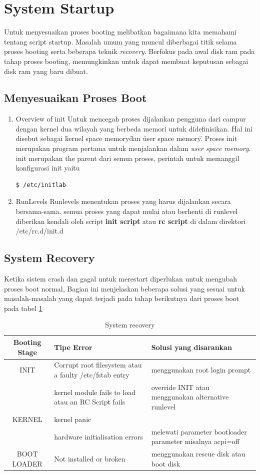 \section{System Startup}
Untuk menyesuaikan proses booting melibatkan bagaimana kita memahami tentang script startup. Masalah umum yang muncul diberbagai titik selama proses booting serta beberapa teknik \textit{recovery}. Berfokus pada awal disk ram pada tahap proses booting, memungkinkan untuk dapat membuat keputusan sebagai disk ram yang baru dibuat.
\subsection{Menyesuaikan Proses Boot}
\begin{enumerate}
\item Overview of init
Untuk mencegah proses dijalankan pengguna dari campur dengan kernel dua wilayah yang berbeda memori untuk didefinisikan. Hal ini disebut sebagai \" kernel space memory\" dan \"user space memory\". Proses init merupakan program pertama untuk menjalankan dalam \textit{user space memory}.
 init merupakan the parent dari semua proses, perintah untuk memanggil konfigurasi init yaitu 
\begin{verbatim}
$ /etc/initlab
\end{verbatim}
\item RunLevels
Runlevels menentukan proses yang harus dijalankan secara bersama-sama.  semua proses yang dapat mulai atau berhenti di runlevel diberikan kendali oleh script \textbf{init script} atau \textbf{rc script} di dalam direktori /etc/rc.d/init.d
\end{enumerate}

\subsection{System Recovery}
Ketika sistem crash dan gagal untuk merestart diperlukan untuk mengubah proses boot normal, Bagian ini menjelaskan beberapa solusi yang sesuai untuk masalah-masalah yang dapat terjadi pada tahap berikutnya dari proses boot pada tabel \ref{recovery}
\begin{table}[h]
		\caption{System recovery}
		\label{recovery}
			\begin{tabular}{|c|l|l|}
			\hline
			\textbf{Booting Stage}&\textbf{Tipe Error}&\textbf{Solusi yang disarankan}\\
			\hline
			INIT&Corrupt root filesystem atau a faulty /etc/fstab entry&menggunakan root login prompt\\
				&kernel module fails to load atau an RC Script fails&override INIT atau menggunakan alternative runlevel\\
			\hline
			KERNEL&kernel panic& 	\\
				&hardware initialisation errors&melewati parameter bootloader parameter misalnya acpi=off\\
			\hline
			BOOT LOADER&Not installed or broken&menggunakan rescue disk atau boot disk\\
			\hline
\end{tabular}
\end{table}

